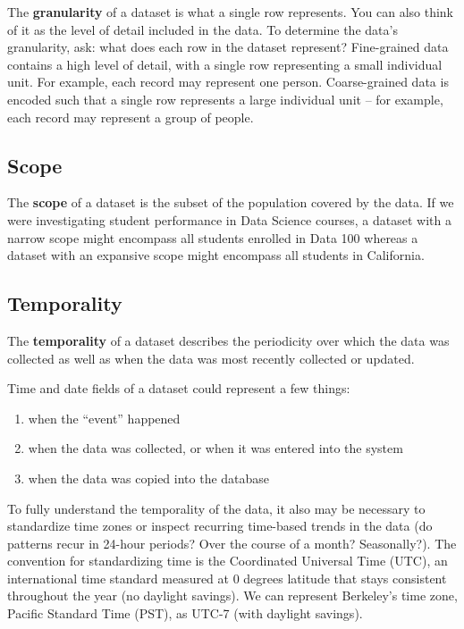 \documentclass[
  letterpaper,
  DIV=11,
  numbers=noendperiod]{scrreprt}
\providecommand{\tightlist}{%
  \setlength{\itemsep}{0pt}\setlength{\parskip}{0pt}}\usepackage{longtable,booktabs,array}
\begin{document}
The \textbf{granularity} of a dataset is what a single row represents.
You can also think of it as the level of detail included in the data. To
determine the data's granularity, ask: what does each row in the dataset
represent? Fine-grained data contains a high level of detail, with a
single row representing a small individual unit. For example, each
record may represent one person. Coarse-grained data is encoded such
that a single row represents a large individual unit -- for example,
each record may represent a group of people.

\subsection{Scope}\label{scope}

The \textbf{scope} of a dataset is the subset of the population covered
by the data. If we were investigating student performance in Data
Science courses, a dataset with a narrow scope might encompass all
students enrolled in Data 100 whereas a dataset with an expansive scope
might encompass all students in California.

\subsection{Temporality}\label{temporality}

The \textbf{temporality} of a dataset describes the periodicity over
which the data was collected as well as when the data was most recently
collected or updated.

Time and date fields of a dataset could represent a few things:

\begin{enumerate}
\def\labelenumi{\arabic{enumi}.}
\tightlist
\item
  when the ``event'' happened
\item
  when the data was collected, or when it was entered into the system
\item
  when the data was copied into the database
\end{enumerate}

To fully understand the temporality of the data, it also may be
necessary to standardize time zones or inspect recurring time-based
trends in the data (do patterns recur in 24-hour periods? Over the
course of a month? Seasonally?). The convention for standardizing time
is the Coordinated Universal Time (UTC), an international time standard
measured at 0 degrees latitude that stays consistent throughout the year
(no daylight savings). We can represent Berkeley's time zone, Pacific
Standard Time (PST), as UTC-7 (with daylight savings).
\end{document}

